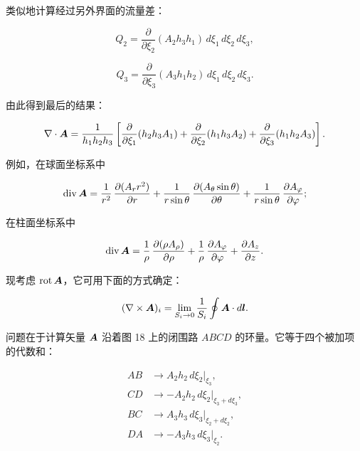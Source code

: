 类似地计算经过另外界面的流量差：

\begin{equation*}
Q_2 = \frac{\partial}{\partial\xi_2} (A_2 h_3 h_1)\, d\xi_1\, d\xi_2\, d\xi_3,
\end{equation*}

\begin{equation*}
Q_3 = \frac{\partial}{\partial\xi_3} (A_3 h_1 h_2)\, d\xi_1\, d\xi_2\, d\xi_3.
\end{equation*}

由此得到最后的结果：

\begin{equation*}
\nabla \cdot \bm{A} = \frac{1}{h_1 h_2 h_3} \left[ \frac{\partial}{\partial\xi_1} (h_2 h_3 A_1) + \frac{\partial}{\partial\xi_2} (h_1 h_3 A_2) + \frac{\partial}{\partial\xi_3} (h_1 h_2 A_3) \right].
\end{equation*}

例如，在球面坐标系中

\begin{equation*}
\operatorname{div}\bm{A} = \frac{1}{r^{2}}\, \frac{\partial (A_r r^{2})}{\partial r} + \frac{1}{r\sin\theta}\, \frac{\partial (A_\theta \sin\theta)}{\partial\theta} + \frac{1}{r\sin\theta}\, \frac{\partial A_\varphi}{\partial\varphi};
\end{equation*}

在柱面坐标系中

\begin{equation*}
\operatorname{div}\bm{A} = \frac{1}{\rho}\, \frac{\partial (\rho A_\rho)}{\partial\rho} + \frac{1}{\rho}\, \frac{\partial A_\varphi}{\partial\varphi} + \frac{\partial A_z}{\partial z}.
\end{equation*}

现考虑 $\operatorname{rot}\bm{A}$，它可用下面的方式确定：

\begin{equation*}
(\nabla \times \bm{A})_i = \lim_{S_i \to 0} \frac{1}{S_i} \oint \bm{A} \cdot d\bm{l}.
\end{equation*}

问题在于计算矢量 $\bm{A}$ 沿着图 18 上的闭围路 $ABCD$ 的环量。它等于四个被加项的代数和：

\begin{equation*}
\begin{aligned}
AB &\longrightarrow A_2 h_2\, d\xi_2 \big|_{\xi_3},\\
CD &\longrightarrow -A_2 h_2\, d\xi_2 \big|_{\xi_3 + d\xi_3},\\
BC &\longrightarrow A_3 h_3\, d\xi_3 \big|_{\xi_2 + d\xi_2},\\
DA &\longrightarrow -A_3 h_3\, d\xi_3 \big|_{\xi_2}.
\end{aligned}
\end{equation*}

